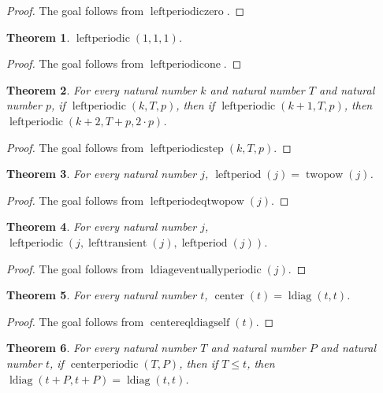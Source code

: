 \documentclass[11pt]{article}
\newtheorem{theorem}{Theorem}[section]
\theoremstyle{definition}
\begin{document}
\begin{proof}
The goal follows from \(\operatorname{leftperiodiczero}\).
\end{proof}
\begin{theorem}
\label{ll:observations:left-periodic-one}
\(\operatorname{leftperiodic}(1, 1, 1)\).
\end{theorem}
\begin{proof}
The goal follows from \(\operatorname{leftperiodicone}\).
\end{proof}
\begin{theorem}
\label{ll:observations:left-periodic-step}
For every natural number \(k\) and natural number \(T\) and natural number \(p\), if \(\operatorname{leftperiodic}(k, T, p)\), then if \(\operatorname{leftperiodic}(k + 1, T, p)\), then \(\operatorname{leftperiodic}(k + 2, T + p, 2 \cdot p)\).
\end{theorem}
\begin{proof}
The goal follows from \(\operatorname{leftperiodicstep}(k, T, p)\).
\end{proof}
\begin{theorem}
\label{ll:observations:left-period-eq-twopow}
For every natural number \(j\), \(\operatorname{leftperiod}(j) = \operatorname{twopow}(j)\).
\end{theorem}
\begin{proof}
The goal follows from \(\operatorname{leftperiodeqtwopow}(j)\).
\end{proof}
\begin{theorem}
\label{ll:observations:ldiag-eventually-periodic}
For every natural number \(j\), \(\operatorname{leftperiodic}(j, \operatorname{lefttransient}(j), \operatorname{leftperiod}(j))\).
\end{theorem}
\begin{proof}
The goal follows from \(\operatorname{ldiageventuallyperiodic}(j)\).
\end{proof}
\begin{theorem}
\label{ll:observations:center-eq-ldiag-self}
For every natural number \(t\), \(\operatorname{center}(t) = \operatorname{ldiag}(t, t)\).
\end{theorem}
\begin{proof}
The goal follows from \(\operatorname{centereqldiagself}(t)\).
\end{proof}
\begin{theorem}
\label{ll:observations:ldiag-self-periodic-of-center-periodic}
For every natural number \(T\) and natural number \(P\) and natural number \(t\), if \(\operatorname{centerperiodic}(T, P)\), then if \(T \le t\), then \(\operatorname{ldiag}(t + P, t + P) = \operatorname{ldiag}(t, t)\).
\end{theorem}
\end{document}
